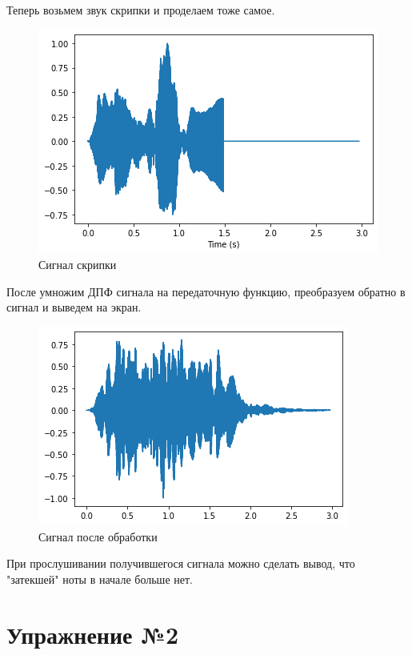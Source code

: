 \documentclass[a4paper, 14pt]{extarticle}
\begin{document}
    Теперь возьмем звук скрипки и проделаем тоже самое.

    \begin{figure}[H]
        \centering
        \includegraphics[width=0.8\linewidth]{violin_wave}
        \caption{Сигнал скрипки}
        \label{fig:signal_cumsum}
    \end{figure}

    После умножим ДПФ сигнала на передаточную функцию, преобразуем обратно в сигнал и выведем на экран.

    \begin{figure}[H]
        \centering
        \includegraphics[width=0.8\linewidth]{violin_spectrum}
        \caption{Сигнал после обработки}
        \label{fig:violin_spectrum}
    \end{figure}

    При прослушивании получившегося сигнала можно сделать вывод, что "затекшей" ноты в начале больше нет.

    \newpage


    \section{Упражнение №2}
    \label{sec:2}
\end{document}
